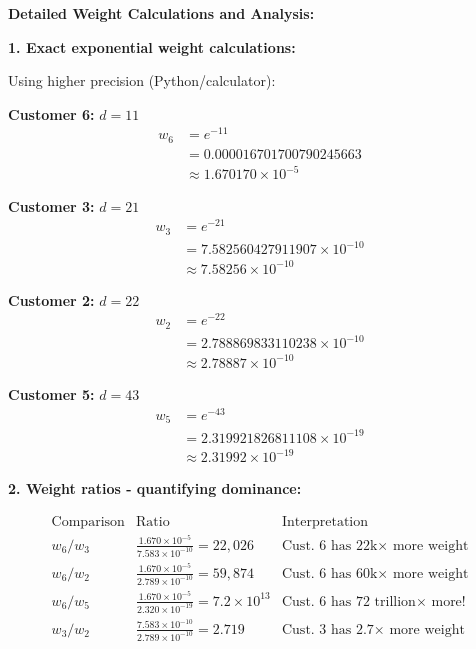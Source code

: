 \documentclass[12pt]{article}
\begin{document}
\begin{computation}
\textbf{Detailed Weight Calculations and Analysis:}

\textbf{1. Exact exponential weight calculations:}

Using higher precision (Python/calculator):

\textbf{Customer 6:} \(d = 11\)
\begin{align*}
w_6 &= e^{-11} \\
&= 0.000016701700790245663 \\
&\approx 1.670170 \times 10^{-5}
\end{align*}

\textbf{Customer 3:} \(d = 21\)
\begin{align*}
w_3 &= e^{-21} \\
&= 7.582560427911907 \times 10^{-10} \\
&\approx 7.58256 \times 10^{-10}
\end{align*}

\textbf{Customer 2:} \(d = 22\)
\begin{align*}
w_2 &= e^{-22} \\
&= 2.788869833110238 \times 10^{-10} \\
&\approx 2.78887 \times 10^{-10}
\end{align*}

\textbf{Customer 5:} \(d = 43\)
\begin{align*}
w_5 &= e^{-43} \\
&= 2.319921826811108 \times 10^{-19} \\
&\approx 2.31992 \times 10^{-19}
\end{align*}

\textbf{2. Weight ratios - quantifying dominance:}

\[
\begin{array}{c|c|c}
\text{Comparison} & \text{Ratio} & \text{Interpretation} \\
\hline
w_6 / w_3 & \frac{1.670 \times 10^{-5}}{7.583 \times 10^{-10}} = 22{,}026 & \text{Cust. 6 has 22k}\times \text{ more weight} \\
w_6 / w_2 & \frac{1.670 \times 10^{-5}}{2.789 \times 10^{-10}} = 59{,}874 & \text{Cust. 6 has 60k}\times \text{ more weight} \\
w_6 / w_5 & \frac{1.670 \times 10^{-5}}{2.320 \times 10^{-19}} = 7.2 \times 10^{13} & \text{Cust. 6 has 72 trillion}\times \text{ more!} \\
w_3 / w_2 & \frac{7.583 \times 10^{-10}}{2.789 \times 10^{-10}} = 2.719 & \text{Cust. 3 has 2.7}\times \text{ more weight} \\
\end{array}
\]


\end{computation}
\end{document}
